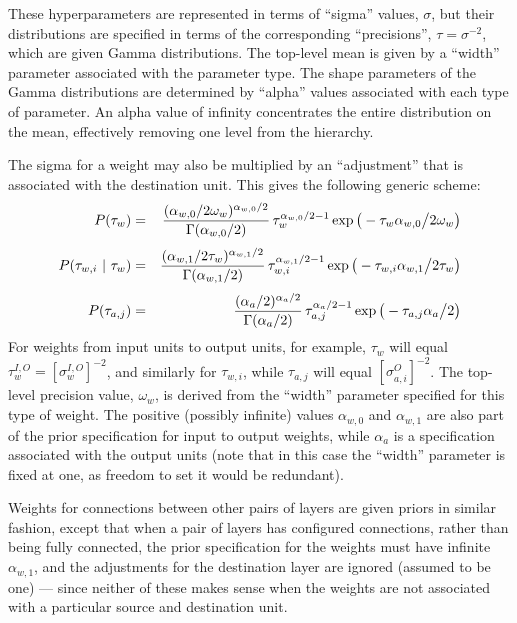 \documentclass{report}[11pt]
\def\beq{\begin{eqnarray}}
\def\eeq{\end{eqnarray}}
\begin{document}
These hyperparameters are represented in terms of ``sigma'' values,
$\sigma$, but their distributions are specified in terms of the
corresponding ``precisions'', $\tau = \sigma^{-2}$, which are given
Gamma distributions.  The top-level mean is given by a ``width''
parameter associated with the parameter type.  The shape parameters of
the Gamma distributions are determined by ``alpha'' values associated
with each type of parameter.  An alpha value of infinity concentrates
the entire distribution on the mean, effectively removing one level
from the hierarchy.

The sigma for a weight may also be multiplied by an ``adjustment'' that
is associated with the destination unit.  This gives the following 
generic scheme:\beq
  P(\tau_w)
   & = & {(\alpha_{w,0}/2\omega_w)^{\alpha_{w,0}/2} 
          \over \Gamma(\alpha_{w,0}/2)}\,
         \tau_w^{\alpha_{w,0}/2-1}
         \exp \big(-\tau_w \alpha_{w,0} \big/ 2 \omega_w\big) \\[3pt]
  P(\tau_{w,i}\ |\ \tau_w)
   & = & {(\alpha_{w,1}/2\tau_w)^{\alpha_{w,1}/2} 
          \over \Gamma(\alpha_{w,1}/2)}\,
         \tau_{w,i}^{\alpha_{w,1}/2-1}
         \exp\big(-\tau_{w,i} \alpha_{w,1} \big/ 2 \tau_w\big) \\[3pt]
  P(\tau_{a,j})
   & = & { (\alpha_a/2)^{\alpha_a/2} \over \Gamma(\alpha_a/2) }\,
         \tau_{a,j}^{\alpha_a/2-1} \exp\big(-\tau_{a,j} \alpha_a \big/ 2\big)
\eeq%
For weights from input units to output units, for example, $\tau_w$
will equal $\tau^{I,O}_w = [\sigma^{I,O}_w]^{-2}$, and similarly for
$\tau_{w,i}$, while $\tau_{a,j}$ will equal $[\sigma^O_{a,i}]^{-2}$.
The top-level precision value, $\omega_w$, is derived from the
``width'' parameter specified for this type of weight. The positive
(possibly infinite) values $\alpha_{w,0}$ and $\alpha_{w,1}$ are
also part of the prior specification for input to output weights,
while $\alpha_a$ is a specification associated with the output units
(note that in this case the ``width'' parameter is fixed at one, as
freedom to set it would be redundant).

Weights for connections between other pairs of layers are given priors
in similar fashion, except that when a pair of layers has configured
connections, rather than being fully connected, the prior
specification for the weights must have infinite $\alpha_{w,1}$, and
the adjustments for the destination layer are ignored (assumed to be
one) --- since neither of these makes sense when the weights are not
associated with a particular source and destination unit.
\end{document}
